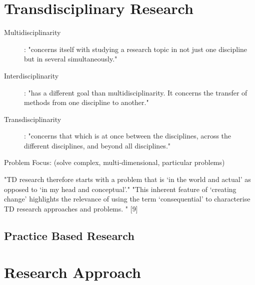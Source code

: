 \section{Transdisciplinary Research}

\begin{description}
  \item [Multidisciplinarity]:	"concerns itself with studying a research topic in not just one discipline but in several simultaneously."
  \item [Interdisciplinarity]:	"has a different goal than multidisciplinarity. It concerns the transfer of methods from one discipline to another."
  \item [Transdisciplinarity]:	"concerns that which is at once between the disciplines, across the different disciplines, and beyond all disciplines."
\end{description} \citep{Nicolescu2010}

Problem Focus: (solve complex, multi-dimensional, particular problems)

"TD research therefore starts with a problem that is ‘in the world and actual’ as opposed to ‘in my head and conceptual’." "This inherent feature of ‘creating change’ highlights the relevance of using the term ‘consequential’ to characterise TD research approaches and problems. " [9]

\subsection{Practice Based Research}

\section{Research Approach}




